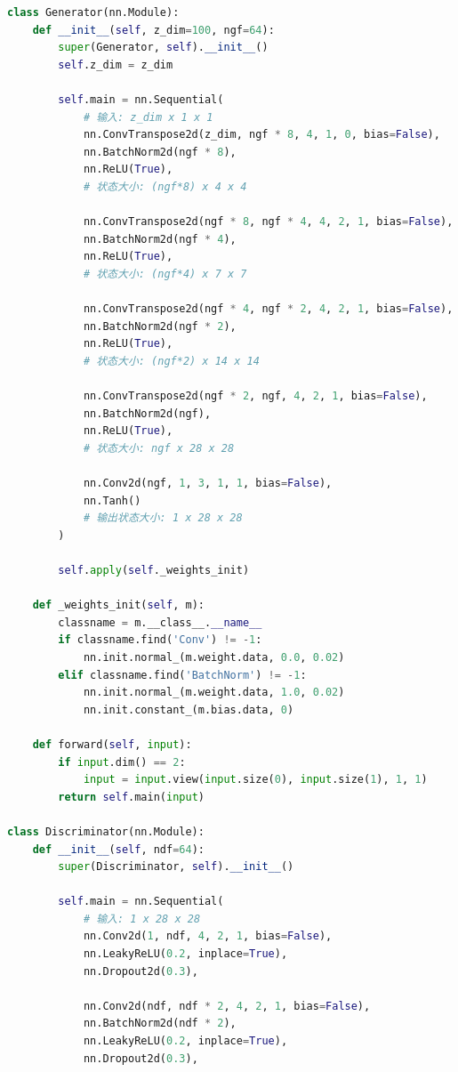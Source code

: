 \documentclass[UTF8]{ctexart}
\begin{document}
\begin{lstlisting}[language=Python, caption=DCGAN生成器和判别器]
class Generator(nn.Module):
    def __init__(self, z_dim=100, ngf=64):
        super(Generator, self).__init__()
        self.z_dim = z_dim
        
        self.main = nn.Sequential(
            # 输入: z_dim x 1 x 1
            nn.ConvTranspose2d(z_dim, ngf * 8, 4, 1, 0, bias=False),
            nn.BatchNorm2d(ngf * 8),
            nn.ReLU(True),
            # 状态大小: (ngf*8) x 4 x 4
            
            nn.ConvTranspose2d(ngf * 8, ngf * 4, 4, 2, 1, bias=False),
            nn.BatchNorm2d(ngf * 4),
            nn.ReLU(True),
            # 状态大小: (ngf*4) x 7 x 7
            
            nn.ConvTranspose2d(ngf * 4, ngf * 2, 4, 2, 1, bias=False),
            nn.BatchNorm2d(ngf * 2),
            nn.ReLU(True),
            # 状态大小: (ngf*2) x 14 x 14
            
            nn.ConvTranspose2d(ngf * 2, ngf, 4, 2, 1, bias=False),
            nn.BatchNorm2d(ngf),
            nn.ReLU(True),
            # 状态大小: ngf x 28 x 28
            
            nn.Conv2d(ngf, 1, 3, 1, 1, bias=False),
            nn.Tanh()
            # 输出状态大小: 1 x 28 x 28
        )
        
        self.apply(self._weights_init)
    
    def _weights_init(self, m):
        classname = m.__class__.__name__
        if classname.find('Conv') != -1:
            nn.init.normal_(m.weight.data, 0.0, 0.02)
        elif classname.find('BatchNorm') != -1:
            nn.init.normal_(m.weight.data, 1.0, 0.02)
            nn.init.constant_(m.bias.data, 0)
    
    def forward(self, input):
        if input.dim() == 2:
            input = input.view(input.size(0), input.size(1), 1, 1)
        return self.main(input)

class Discriminator(nn.Module):
    def __init__(self, ndf=64):
        super(Discriminator, self).__init__()
        
        self.main = nn.Sequential(
            # 输入: 1 x 28 x 28
            nn.Conv2d(1, ndf, 4, 2, 1, bias=False),
            nn.LeakyReLU(0.2, inplace=True),
            nn.Dropout2d(0.3),
            
            nn.Conv2d(ndf, ndf * 2, 4, 2, 1, bias=False),
            nn.BatchNorm2d(ndf * 2),
            nn.LeakyReLU(0.2, inplace=True),
            nn.Dropout2d(0.3),
            

\end{lstlisting}
\end{document}
